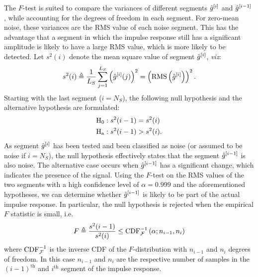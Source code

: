 \begin{enumerate}
  The $F$-test is suited to compare the variances of different segments ${\hat{g}}^{[i]}$ and ${\hat{g}}^{[i-1]}$ \citep{Parsons1974}, while accounting for the degrees of freedom in each segment.
  For zero-mean noise, these variances are the \gls{RMS} value of each noise segment.
  This has the advantage that a segment in which the impulse response still has a significant amplitude is likely to have a large \gls{RMS} value, which is more likely to be detected.
  Let $s^2(i)$ denote the mean square value of segment ${\hat{g}}^{[i]}$, \emph{viz}:
  \begin{equation}
    s^2(i) 
    \triangleq \frac{1}{L_S} \sum_{j=1}^{L_S} \left({\hat{g}}^{[i]}(j)\right)^2
    = \left( \operatorname{RMS} \left( \hat{g}^{[i]} \right) \right)^2
           \text{.}
  \end{equation}
  Starting with the last segment ($i = N_S$), the following null hypothesis and the alternative hypothesis are formulated:
  \begin{align}
     \mathrm{H}_{\mathrm{0}} &: s^2(i-1) = s^2(i)\\
     \mathrm{H}_{\mathrm{a}}    &: s^2(i-1) > s^2(i)
     \text{.}
  \end{align}
  As segment ${\hat{g}}^{[i]}$ has been tested and been classified as noise (or assumed to be noise if $i=N_S$), the null hypothesis effectively states that the segment ${\hat{g}}^{[i-1]}$ is also noise.
  The alternative case occurs when ${\hat{g}}^{[i-1]}$ has a significant change, which indicates the presence of the signal.
  Using the $F$-test on the \gls{RMS} values of the two segments with a high confidence level of $\alpha=0.999$ and the aforementioned hypotheses, we can determine whether ${\hat{g}}^{[i-1]}$ is likely to be part of the actual impulse response.
  In particular, the null hypothesis is rejected when the empirical $F$ statistic is small, i.e.
  \begin{equation}
    F \triangleq \frac{s^2(i-1)}{s^2(i)} \leq \mathrm{CDF}^{-1}_{\operatorname{\mathcal{F}}} \left( \alpha; n_{i-1}, n_{i} \right)
  \end{equation}
  where $ \mathrm{CDF}^{-1}_{\operatorname{\mathcal{F}}}$ is the inverse \gls{CDF} of the \mbox{$F$-distribution} with $n_{i-1}$ and $n_{i}$ degrees of freedom.
  In this case $n_{i-1}$ and $n_{i}$ are the respective number of samples in the $(i-1)^{\text{th}}$ and $i^{\text{th}}$ segment of the impulse response.


\end{enumerate}
